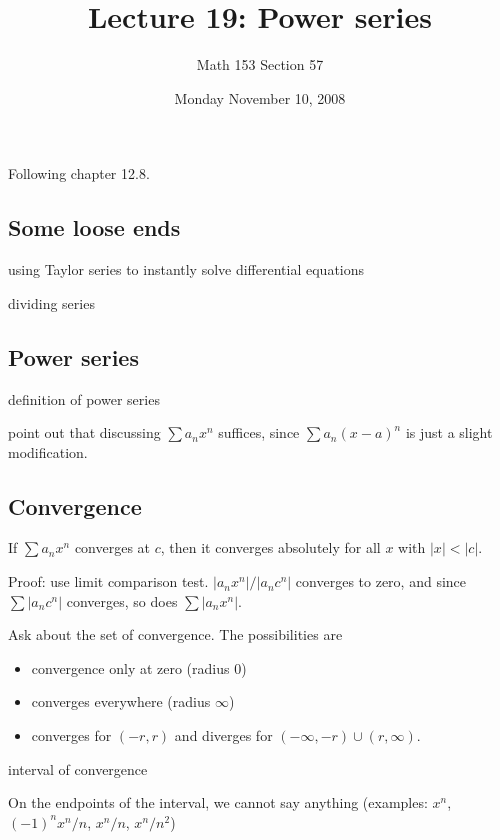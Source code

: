\documentclass[12pt]{article}
\title{Lecture 19: Power series}
\author{Math 153 Section 57}
\date{Monday November 10, 2008}
\begin{document}
\maketitle

Following chapter 12.8.

\subsection*{Some loose ends}

using Taylor series to instantly solve differential equations

dividing series

\subsection*{Power series}

definition of power series

point out that discussing $\sum a_n x^n$ suffices, since $\sum a_n
(x-a)^n$ is just a slight modification.

\subsection*{Convergence}

If $\sum a_n x^n$ converges at $c$, then it converges absolutely for all $x$ with $|x| < |c|$.

Proof: use limit comparison test.  $|a_n x^n| / |a_n c^n|$ converges to zero, and since $\sum |a_n c^n|$ converges, so does $\sum |a_n x^n|$.

Ask about the set of convergence.  The possibilities are
\begin{itemize}
\item convergence only at zero (radius $0$)
\item converges everywhere (radius $\infty$)
\item converges for $(-r,r)$ and diverges for $(-\infty,-r) \cup (r,\infty)$.
\end{itemize}

interval of convergence

On the endpoints of the interval, we cannot say anything (examples: $x^n$, $(-1)^n x^n / n$, $x^n/n$, $x^n / n^2$)
\end{document}
